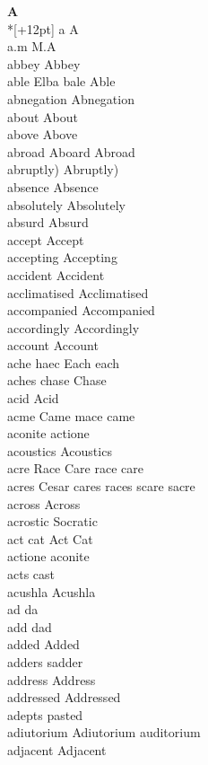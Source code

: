 \vspace{14pt}
\noindent\textbf{\Large A}\\*[+12pt]
a A\\
a.m M.A\\
abbey Abbey\\
able Elba bale Able\\
abnegation Abnegation\\
about About\\
above Above\\
abroad Aboard Abroad\\
abruptly) Abruptly)\\
absence Absence\\
absolutely Absolutely\\
absurd Absurd\\
accept Accept\\
accepting Accepting\\
accident Accident\\
acclimatised Acclimatised\\
accompanied Accompanied\\
accordingly Accordingly\\
account Account\\
ache haec Each each\\
aches chase Chase\\
acid Acid\\
acme Came mace came\\
aconite actione\\
acoustics Acoustics\\
acre Race Care race care\\
acres Cesar cares races scare sacre\\
across Across\\
acrostic Socratic\\
act cat Act Cat\\
actione aconite\\
acts cast\\
acushla Acushla\\
ad da\\
add dad\\
added Added\\
adders sadder\\
address Address\\
addressed Addressed\\
adepts pasted\\
adiutorium Adiutorium auditorium\\
adjacent Adjacent\\
